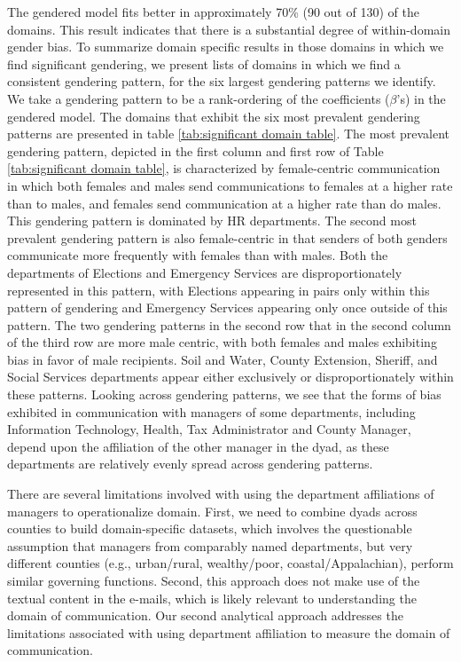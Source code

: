 \documentclass{pnastwo}
\begin{document}
\begin{article}
The gendered model fits better in approximately 70\% (90 out of 130) of the domains. This result indicates that there is a substantial degree of within-domain gender bias. To summarize domain specific results in those domains in which we find significant gendering, we present lists of domains in which we find a consistent gendering pattern, for the six largest gendering patterns we identify. We take a gendering pattern to be a rank-ordering of the coefficients ($\beta$'s) in the gendered model. The domains that exhibit the six most prevalent gendering patterns are presented in table \ref{tab:significant domain table}. The most prevalent gendering pattern, depicted in the first column and first row of Table \ref{tab:significant domain table}, is characterized by female-centric communication in which both females and males send communications to females at a higher rate than to males, and females send communication at a higher rate than do males. This gendering pattern is dominated by HR departments. The second most prevalent gendering pattern is also female-centric in that senders of both genders communicate more frequently with females than with males. Both the departments of Elections and Emergency Services are disproportionately represented in this pattern, with Elections appearing in pairs only within this pattern of gendering and Emergency Services appearing only once outside of this pattern. The two gendering patterns in the second row that in the second column of the third row are more male centric, with both females and males exhibiting bias in favor of male recipients. Soil and Water, County Extension, Sheriff, and Social Services departments appear either exclusively or disproportionately within these patterns. Looking across gendering patterns, we see that the forms of bias exhibited in communication with managers of some departments, including Information Technology, Health, Tax Administrator and County Manager, depend upon the affiliation of the other manager in the dyad, as these departments are relatively evenly spread across gendering patterns. 

There are several limitations involved with using the department affiliations of managers to operationalize domain. First, we need to combine dyads across counties to build domain-specific datasets, which involves the questionable assumption that managers from comparably named departments, but very different counties (e.g., urban/rural, wealthy/poor, coastal/Appalachian), perform similar governing functions. Second, this approach does not make use of the textual content in the e-mails, which is likely relevant to understanding the domain of communication. Our second analytical approach addresses the limitations associated with using department affiliation to measure the domain of communication.


\end{article}
\end{document}
